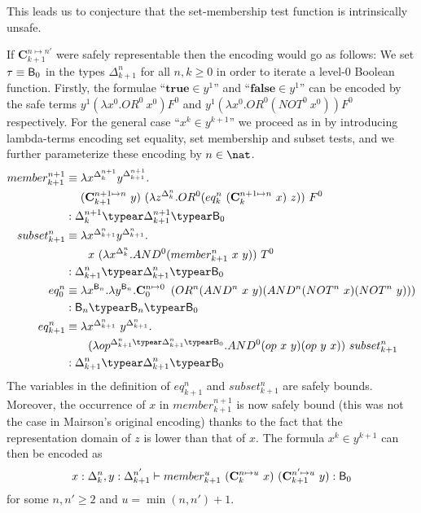 This leads us to conjecture that the set-membership test function is intrinsically unsafe.
\smallskip



If $\mathbf{C}^{n\mapsto n'}_{k+1}$ were safely representable then the encoding would go as follows: We set $\tau \equiv \mathsf{B}_0$ in the types  $\Delta_{k+1}^n$ for all $n,k\geq 0$ in order to iterate a level-$0$ Boolean function.
Firstly, the formulae ``$\mathbf{true} \in y^1$'' and ``$\mathbf{false} \in y^1$'' can be encoded by the safe terms $y^1 (\lambda x^0 . OR^0~x^0) F^0$ and $y^1 (\lambda x^0. OR^0(NOT^0~x^0)) F^0$ respectively.
For the general case ``$x^k\in y^{k+1}$''
we proceed as in \cite{mairson1992spt} by introducing lambda-terms encoding set equality, set membership and subset tests, and we further parameterize these encoding by $n\in\nat$.
\begin{align*}
member_{k+1}^{n+1} &\equiv \lambda x^{\Delta_k^{n+1}} y^{\Delta_{k+1}^{n+1}}. \\
& \quad\ (\mathbf{C}_{k+1}^{n+1\mapsto n}~y)~(\lambda z^{\Delta_k^n} . OR^0 (eq_k^n~(\mathbf{C}^{n+1\mapsto n}_k~x)~z))~F^0\\
  & : \Delta_k^{n+1} \typear \Delta_{k+1}^{n+1} \typear \booltype_0
\\
subset_{k+1}^n &\equiv \lambda x^{\Delta_{k+1}^n} y^{\Delta_{k+1}^n}. \\
  & \qquad x~(\lambda x^{\Delta_k^n} . AND^0 (member_{k+1}^n~x~y))~T^0 \\
  & : \Delta_{k+1}^n \typear \Delta_{k+1}^n \typear\booltype_0
\\
eq_0^n &\equiv \lambda x^{\booltype_n} .\lambda y^{\booltype_n}. \mathbf{C}_0^{n\mapsto 0}~ \left(OR^n (AND^n~x~y) (AND^n (NOT^n~x)(NOT^n~y))\right) \\
 &: \booltype_n \typear \booltype_n \typear\booltype_0
\\
eq_{k+1}^n &\equiv \lambda x^{\Delta_{k+1}^n}~ y^{\Delta_{k+1}^n}. \\
   & \qquad
   (\lambda op^{\Delta_{k+1}^n\typear\Delta_{k+1}^n\typear\booltype_0}. AND^0 (op~x~y)(op~y~x))~subset_{k+1}^n \\
  & : \Delta_{k+1}^n \typear \Delta_{k+1}^n \typear \booltype_0
\end{align*}
The variables in the definition of $eq_{k+1}^n$ and $subset_{k+1}^n$
are safely bounds. Moreover, the occurrence of $x$ in
$member_{k+1}^{n+1}$ is now safely bound (this was not the case in
Mairson's original encoding) thanks to the fact that the
representation domain of $z$ is lower than that of $x$. The formula
$x^k\in y^{k+1}$ can then be encoded as
$$x:\Delta_k^n, y:\Delta_{k+1}^{n'}\vdash member_{k+1}^{u}~ (\mathbf{C}_k^{n\mapsto u}~x)~(\mathbf{C}^{n'\mapsto u}_{k+1} ~y) : \mathsf{B}_0$$
for some $n,n'\geq 2$ and $u = \min(n,n')+1$.

